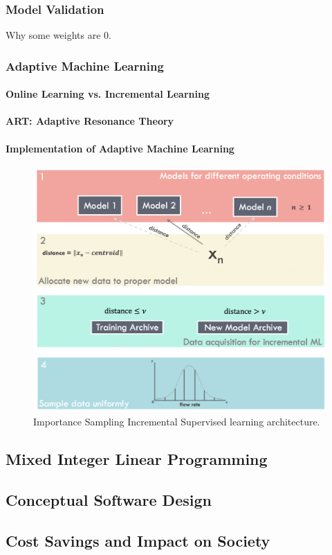 \subsubsection{Model Validation}
Why some weights are 0.

\subsubsection{Adaptive Machine Learning}
\paragraph{Online Learning vs. Incremental Learning}
\paragraph{ART: Adaptive Resonance Theory}
\paragraph{Implementation of Adaptive Machine Learning}

\begin{figure}
    \centering
    \includegraphics[width=\textwidth]{images/08IncrementalLearning.png}
    \caption{Importance Sampling Incremental Supervised learning architecture.}
    \label{fig:08ART}
\end{figure}

\subsection{Mixed Integer Linear Programming}
\subsection{Conceptual Software Design}
\subsection{Cost Savings and Impact on Society}
